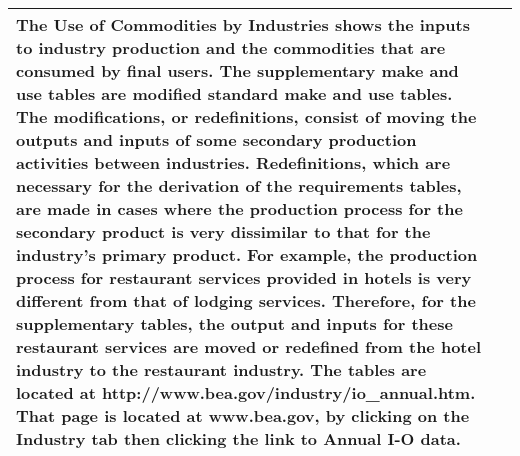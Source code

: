 \begin{table}
\begin{center}
\begin{tabular}{l @{\hspace{2em}} p{10cm}}
The Use of Commodities by Industries shows the inputs to industry production and the commodities that are consumed by final users. The supplementary make and use tables are modified standard make and use tables. The modifications, or redefinitions, consist of moving the outputs and inputs of some secondary production activities between industries. Redefinitions, which are necessary for the derivation of the requirements tables, are made in cases where the production process for the secondary product is very dissimilar to that for the industry’s primary product. For example, the production process for restaurant services provided in hotels is very different from that of lodging services. Therefore, for the supplementary tables, the output and inputs for these restaurant services are moved or redefined from the hotel industry to the restaurant industry. The tables are located at http://www.bea.gov/industry/io\_annual.htm. That page is located at  www.bea.gov, by clicking on the Industry tab then clicking the link to Annual I-O data.\\
    \bottomrule
  \end{tabular}

\end{center}
\label{tab:data_definitions}
\end{table}

